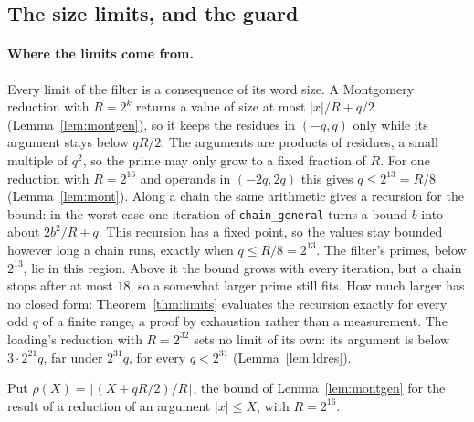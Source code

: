 \documentclass[10pt,a4paper]{article}
\newcommand{\code}[1]{\texttt{#1}}
\theoremstyle{plain}
\theoremstyle{definition}
\begin{document}
\subsection{The size limits, and the guard}\label{sec:limits}

\paragraph{Where the limits come from.}  Every limit of the filter is a consequence of its word size.  A Montgomery reduction with $R=2^k$ returns a value of
size at most $|x|/R+q/2$ (Lemma~\ref{lem:montgen}), so it keeps the residues in $(-q,q)$ only while its argument stays below $qR/2$.  The arguments are products of
residues, a small multiple of $q^2$, so the prime may only grow to a fixed fraction of $R$.  For one reduction with $R=2^{16}$ and operands in $(-2q,2q)$ this gives
$q\le2^{13}=R/8$ (Lemma~\ref{lem:mont}).  Along a chain the same arithmetic gives a recursion for the bound: in the worst case one iteration of
\code{chain\_general} turns a bound $b$ into about $2b^2/R+q$.  This recursion has a fixed point, so the values stay bounded however long a chain runs, exactly
when $q\le R/8=2^{13}$.  The filter's primes, below $2^{13}$, lie in this region.  Above it the bound grows with every iteration, but a chain stops after at most
$18$, so a somewhat larger prime still fits.  How much larger has no closed form: Theorem~\ref{thm:limits} evaluates the recursion exactly for every odd $q$ of a
finite range, a proof by exhaustion rather than a measurement.  The loading's reduction with $R=2^{32}$ sets no limit of its own: its argument is below
$3\cdot2^{21}q$, far under $2^{31}q$, for every $q<2^{31}$ (Lemma~\ref{lem:ldres}).

Put $\rho(X)=\lfloor(X+qR/2)/R\rfloor$, the bound of Lemma~\ref{lem:montgen} for the result of a reduction of an argument $|x|\le X$, with $R=2^{16}$.
\end{document}
